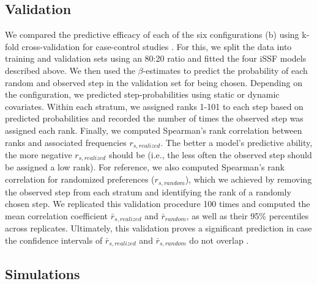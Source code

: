 \documentclass[abstract=on,10pt,a4paper,bibliography=totocnumbered]{article}
\begin{document}
\subsection{Validation}

We compared the predictive efficacy of each of the six configurations
(b) using k-fold cross-validation for case-control
studies \citep{Fortin.2009}. For this, we split the data into training and
validation sets using an 80:20 ratio and fitted the four iSSF models described
above. We then used the $\beta$-estimates to predict the probability of each
random and observed step in the validation set for being chosen. Depending on
the configuration, we predicted step-probabilities using static or dynamic
covariates. Within each stratum, we assigned ranks 1-101 to each step based on
predicted probabilities and recorded the number of times the observed step was
assigned each rank. Finally, we computed Spearman's rank correlation between
ranks and associated frequencies $r_{s, realized}$. The better a model's
predictive ability, the more negative $r_{s, realized}$ should be (i.e., the
less often the observed step should be assigned a low rank). For reference, we
also computed Spearman's rank correlation for randomized preferences ($r_{s,
random}$), which we achieved by removing the observed step from each stratum and
identifying the rank of a randomly chosen step. We replicated this validation
procedure 100 times and computed the mean correlation coefficient $\bar{r}_{s,
realized}$ and $\bar{r}_{random}$, as well as their 95\% percentiles across
replicates. Ultimately, this validation proves a significant prediction in case
the confidence intervals of \(\bar{r}_{s, realized}\) and \(\bar{r}_{s,
random}\) do not overlap \citep{Fortin.2009}.

\subsection{Simulations}
\end{document}
